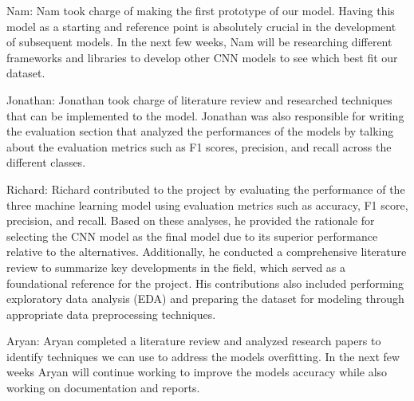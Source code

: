 \documentclass[conference]{IEEEtran}
\begin{document}
Nam: Nam took charge of making the first prototype of our model. Having this model as a starting and reference point is absolutely crucial in the development of subsequent models. In the next few weeks, Nam will be researching different frameworks and libraries to develop other CNN models to see which best fit our dataset.

Jonathan: Jonathan took charge of literature review and researched techniques that can be implemented to the model. Jonathan was also responsible for writing the evaluation section that analyzed the performances of the models by talking about the evaluation metrics such as F1 scores, precision, and recall across the different classes. 

Richard: Richard contributed to the project by evaluating the performance of the three machine learning model using evaluation metrics such as accuracy, F1 score, precision, and recall. Based on these analyses, he provided the rationale for selecting the CNN model as the final model due to its superior performance relative to the alternatives. Additionally, he conducted a comprehensive literature review to summarize key developments in the field, which served as a foundational reference for the project. His contributions also included performing exploratory data analysis (EDA) and preparing the dataset for modeling through appropriate data preprocessing techniques.

Aryan: Aryan completed a literature review and analyzed research papers to identify techniques we can use to address the models overfitting. In the next few weeks Aryan will continue working to improve the models accuracy while also working on documentation and reports. 
\end{document}
